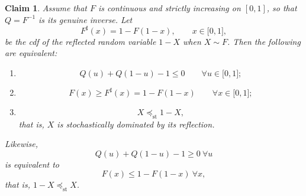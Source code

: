 \documentclass[onecolumn]{article}
\newtheorem{claim}[theorem]{Claim}
\begin{document}
\begin{claim}
\label{prob-meaning} Assume that $F$ is continuous and strictly increasing
on $[0,1]$, so that $Q=F^{-1}$ is its genuine inverse. Let 
\begin{equation}
F^{\sharp }(x)=1-F(1-x),\qquad x\in \lbrack 0,1],  \label{1409}
\end{equation}%
be the cdf of the reflected random variable $1-X$ when $X\sim F$. Then the
following are equivalent:

\begin{enumerate}
\item 
\begin{equation}
Q(u)+Q(1-u)-1\leq 0\qquad \forall u\in \lbrack 0,1];  \label{1410}
\end{equation}

\item 
\begin{equation}
F(x)\geq F^{\sharp }(x)=1-F(1-x)\qquad \forall x\in \lbrack 0,1];
\label{1411}
\end{equation}

\item 
\begin{equation}
X\preceq _{\mathrm{st}}1-X,  \label{1412}
\end{equation}%
that is, $X$ is stochastically dominated by its reflection.
\end{enumerate}

Likewise, 
\begin{equation}
Q(u)+Q(1-u)-1\geq 0\ \forall u  \label{1413}
\end{equation}%
is equivalent to 
\begin{equation}
F(x)\leq 1-F(1-x)\ \forall x,  \label{1414}
\end{equation}%
that is, $1-X\preceq _{\mathrm{st}}X$.
\end{claim}
\end{document}
